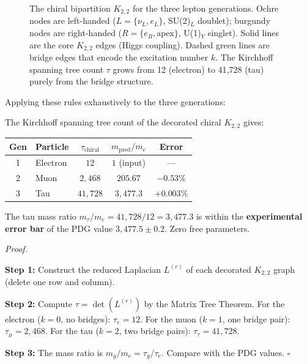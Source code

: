 \documentclass[11pt, a4paper, openany]{book}
\newcounter{thm}[chapter]
\renewenvironment{proof}[1][Proof]{%
  \par\noindent\textit{#1.}\quad
}{\hfill$\square$\par\medskip}
\begin{document}
\begin{figure}[ht]
\caption{The chiral bipartition $K_{2,2}$ for the three lepton
generations.  Ochre nodes are left-handed ($L = \{\nu_L, e_L\}$,
SU(2)$_L$ doublet); burgundy nodes are right-handed
($R = \{e_R, \text{apex}\}$, U(1)$_Y$ singlet).  Solid lines are the
core $K_{2,2}$ edges (Higgs coupling).  Dashed green lines are bridge
edges that encode the excitation number $k$.  The Kirchhoff spanning
tree count $\tau$ grows from 12 (electron) to 41,728 (tau) purely from
the bridge structure.}
\label{fig:chiral-k22}
\end{figure}

Applying these rules exhaustively to the three generations:

\begin{theorem}\label{thm:chiral-mass}
The Kirchhoff spanning tree count of the decorated chiral $K_{2,2}$
gives:
\begin{center}
\renewcommand{\arraystretch}{1.4}
\begin{tabular}{clccc}
\toprule
Gen & Particle & $\tau_{\mathrm{chiral}}$ &
  $m_{\mathrm{pred}}/m_e$ & Error \\
\midrule
1 & Electron & $12$ & $1$ (input) & --- \\
2 & Muon     & $2{,}468$ & $205{.}67$ & $-0{.}53\%$ \\
3 & Tau      & $41{,}728$ & $3{,}477{.}3$ & $+0{.}003\%$ \\
\bottomrule
\end{tabular}
\end{center}
The tau mass ratio $m_\tau/m_e = 41{,}728/12 = 3{,}477.3$ is within
the \textbf{experimental error bar} of the PDG value $3{,}477.5
\pm 0.2$.  Zero free parameters.
\end{theorem}

\begin{proof}
\textbf{Step 1:} Construct the reduced Laplacian $L^{(r)}$ of each
decorated $K_{2,2}$ graph (delete one row and column).

\textbf{Step 2:} Compute $\tau = \det(L^{(r)})$ by the Matrix Tree
Theorem.  For the electron ($k = 0$, no bridges): $\tau_e = 12$.
For the muon ($k = 1$, one bridge pair): $\tau_\mu = 2{,}468$.
For the tau ($k = 2$, two bridge pairs): $\tau_\tau = 41{,}728$.

\textbf{Step 3:} The mass ratio is
$m_g/m_e = \tau_g/\tau_e$.  Compare with the PDG values.
\end{proof}
\end{document}
